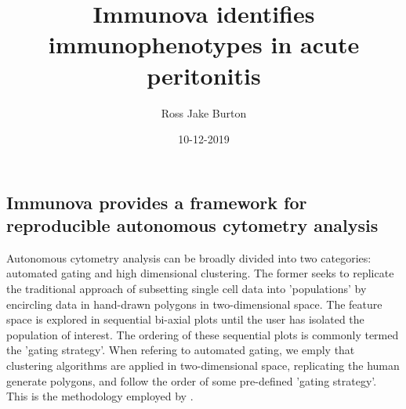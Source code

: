 \documentclass{article}
\begin{document}
\title{Immunova identifies immunophenotypes in acute peritonitis}
\date{10-12-2019}
\author{Ross Jake Burton}

\maketitle
\newpage
{}

\begin{flushleft}
\section{Immunova provides a framework for reproducible autonomous cytometry analysis}
	
Autonomous cytometry analysis can be broadly divided into two categories: automated gating 	
and high dimensional clustering. The former seeks to replicate the traditional approach of subsetting single cell data into 'populations' by encircling data in hand-drawn polygons in two-dimensional space. The feature space is explored in sequential bi-axial plots until the user has isolated the population of interest. The ordering of these sequential plots is commonly termed the 'gating strategy'. When refering to automated gating, we emply that clustering algorithms are applied in two-dimensional space, replicating the human generate polygons, and follow the order of some pre-defined 'gating strategy'. This is the methodology employed by \cite{opencyto}.
\end{flushleft}

\printbibliography
\end{document}
